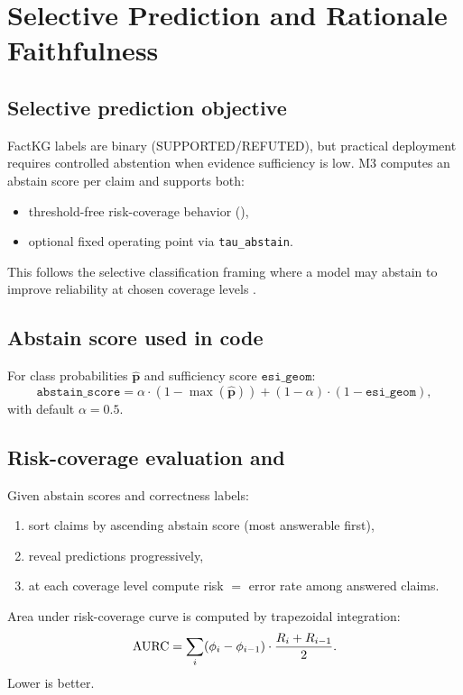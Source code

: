 \section{Selective Prediction and Rationale Faithfulness}
\label{sec:selective-salience}

\subsection{Selective prediction objective}
FactKG labels are binary (SUPPORTED/REFUTED), but practical deployment requires controlled abstention when evidence sufficiency is low.
M3 computes an abstain score per claim and supports both:
\begin{itemize}
\item threshold-free risk-coverage behavior (\AURC{}),
\item optional fixed operating point via \texttt{tau\_abstain}.
\end{itemize}
This follows the selective classification framing where a model may abstain to improve reliability at chosen coverage levels \cite{geifman2017selective}.

\subsection{Abstain score used in code}
For class probabilities $\hat{\mathbf{p}}$ and sufficiency score $\texttt{esi\_geom}$:
\[
\texttt{abstain\_score}
= \alpha\cdot (1-\max(\hat{\mathbf{p}})) + (1-\alpha)\cdot (1-\texttt{esi\_geom}),
\]
with default $\alpha=0.5$.

\subsection{Risk-coverage evaluation and \AURC}
Given abstain scores and correctness labels:
\begin{enumerate}
\item sort claims by ascending abstain score (most answerable first),
\item reveal predictions progressively,
\item at each coverage level compute risk $=$ error rate among answered claims.
\end{enumerate}
Area under risk-coverage curve is computed by trapezoidal integration:
\[
\operatorname{AURC} = \sum_i (\phi_i-\phi_{i-1})\cdot\frac{R_i+R_{i-1}}{2}.
\]
Lower \AURC{} is better.

